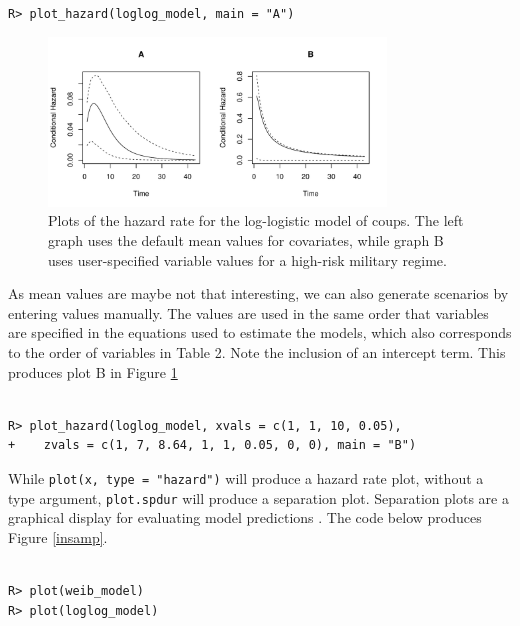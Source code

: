 \documentclass[12pt,onesided]{amsart}
\begin{document}
\begin{lstlisting}

R> plot_hazard(loglog_model, main = "A")

\end{lstlisting}

\begin{figure}
\begin{center}
\includegraphics[width=0.8\textwidth]{graphics/hazard-ex.pdf}
\caption{Plots of the hazard rate for the log-logistic model of coups. The left graph uses the default mean values for covariates, while graph B uses user-specified variable values for a high-risk military regime.}
\label{hazard-ex}
\end{center}
\end{figure}

As mean values are maybe not that interesting, we can also generate
scenarios by entering values manually. The values are used in the same
order that variables are specified in the equations used to estimate the
models, which also corresponds to the order of variables in Table 2.
Note the inclusion of an intercept term. This produces plot B in Figure
\ref{hazard-ex}

\begin{lstlisting}

R> plot_hazard(loglog_model, xvals = c(1, 1, 10, 0.05), 
+    zvals = c(1, 7, 8.64, 1, 1, 0.05, 0, 0), main = "B")

\end{lstlisting}

While \texttt{plot(x, type = "hazard")} will produce a hazard rate plot, without a type argument,
\texttt{plot.spdur} will produce a separation plot. Separation plots are a graphical
display for evaluating model predictions \citep{greenhill2011separation}. The code below produces Figure \ref{insamp}.

\begin{lstlisting}

R> plot(weib_model)
R> plot(loglog_model)

\end{lstlisting}
\end{document}
